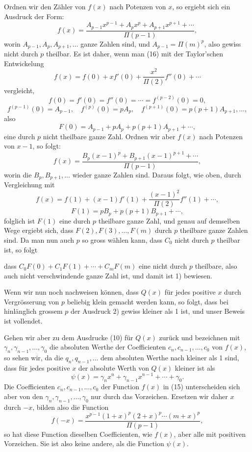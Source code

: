 \documentclass[11pt]{article}
\begin{document}
Ordnen wir den Zähler von $f(x)$ nach Potenzen von $x$, so ergiebt sich ein Ausdruck der Form:
\begin{equation}\tag{16}
f(x)=\frac{A_{p-1}x^{p-1}+A_px^p+A_{p+1}x^{p+1}+\cdots}{\Pi(p-1)},
\end{equation}
worin $A_{p-1},A_p,A_{p+1},\ldots$ ganze Zahlen sind, und $A_{p-1}=\Pi(m)^p$, also gewiss nicht durch $p$ theilbar. Es ist daher, wenn man (16) mit der Taylor'schen Entwickelung
\[
f(x)=f(0)+xf'(0)+\frac{x^2}{\Pi(2)}f''(0)+\cdots
\]
vergleicht,
\[
f(0)=f'(0)=f''(0)=\cdots=f^{(p-2)}(0)=0,
\]
\[
f^{(p-1)}(0)=A_{p-1},\quad f^{(p)}(0)=pA_p,\quad
f^{(p+1)}(0)=p(p+1)A_{p+1},\ldots,
\]
also
\[
F(0)=A_{p-1}+pA_p+p(p+1)A_{p+1}+\cdots,
\]
eine durch $p$ nicht theilbare ganze Zahl. Ordnen wir aber $f(x)$ nach Potenzen von $x-1$, so folgt:
\[
f(x)=\frac{B_p(x-1)^p+B_{p+1}(x-1)^{p+1}+\cdots}{\Pi(p-1)},
\]
worin die $B_p,B_{p+1},\ldots$ wieder ganze Zahlen sind. Daraus folgt, wie oben, durch Vergleichung mit
\[
f(x)=f(1)+(x-1)f'(1)+\frac{(x-1)^2}{\Pi(2)}f''(1)+\cdots,
\]
\[
F(1)=pB_p+p(p+1)B_{p+1}+\cdots,
\]
folglich ist $F(1)$ eine durch $p$ theilbare ganze Zahl, und genau auf demselben Wege ergiebt sich, dass $F(2),F(3),\ldots,F(m)$ durch $p$ theilbare ganze Zahlen sind. Da man nun auch $p$ so gross wählen kann, dass $C_0$ nicht durch $p$ theilbar ist, so folgt

dass $C_0F(0)+C_1F(1)+\cdots+C_mF(m)$ eine nicht durch $p$ theilbare, also auch nicht verschwindende ganze Zahl ist, und damit ist 1) bewiesen.

Wenn wir nun noch nachweisen können, dass $Q(x)$ für jedes positive $x$ durch Vergrösserung von $p$ beliebig klein gemacht werden kann, so folgt, dass bei hinlänglich grossem $p$ der Ausdruck 2) gewiss kleiner als 1 ist, und unser Beweis ist vollendet.

Gehen wir aber zu dem Ausdrucke (10) für $Q(x)$ zurück und bezeichnen mit $\gamma_n,\gamma_{n-1},\ldots,\gamma_0$ die absoluten Werthe der Coefficienten $c_n,c_{n-1},\ldots,c_0$ von $f(x)$, so sehen wir, da die $q_n,q_{n-1},\ldots$ dem absoluten Werthe nach kleiner als 1 sind, dass für jedes positive $x$ der absolute Werth von $Q(x)$ kleiner ist als
\begin{equation}\tag{17}
\psi(x)=\gamma_nx^n+\gamma_{n-1}x^{n-1}+\cdots+\gamma_0.
\end{equation}
Die Coefficienten $c_n,c_{n-1},\ldots,c_0$ der Function $f(x)$ in (15) unterscheiden sich aber von den $\gamma_n,\gamma_{n-1},\ldots,\gamma_0$ nur durch das Vorzeichen. Ersetzen wir daher $x$ durch $-x$, bilden also die Function
\[
f(-x)=\frac{x^{p-1}(1+x)^p(2+x)^p\cdots(m+x)^p}{\Pi(p-1)},
\]
so hat diese Function dieselben Coefficienten, wie $f(x)$, aber alle mit positiven Vorzeichen. Sie ist also keine andere, als die Function $\psi(x)$.
\end{document}
